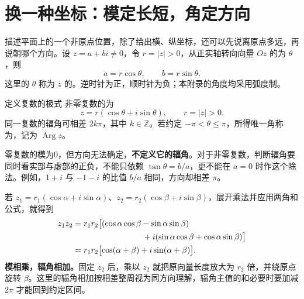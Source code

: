 \documentclass[a4paper,12pt,twoside,openany,fontset=none]{ctexbook}
\renewcommand{\le}{\leqslant}
\newcounter{definition}[chapter]
\newenvironment{definition}[1][]{\begin{defBox}{定义}{#1}}{\end{defBox}}
\numberwithin{equation}{chapter}
\begin{document}
\section{换一种坐标：模定长短，角定方向}

描述平面上的一个非原点位置，除了给出横、纵坐标，还可以先说离原点多远，再说朝哪个方向。设 $z=a+bi\ne0$，令 $r=|z|>0$，从正实轴转向向量 $Oz$ 的为 $\theta$，则
\[
    a=r\cos\theta,\qquad b=r\sin\theta.
\]
这里的 $\theta$ 称为 $z$ 的。逆时针为正，顺时针为负；本附录的角度均采用弧度制。

\begin{definition}[复数的极式]
非零复数的\textbf{}为
\[
    z=r(\cos\theta+i\sin\theta),\qquad r=|z|>0.
\]
同一复数的辐角可相差 $2k\pi$，其中 $k\in\mathbb Z$。若约定 $-\pi<\theta\le\pi$，所得唯一角称为\textbf{}，记为 $\operatorname{Arg}z$。
\end{definition}

零复数的模为0，但方向无法确定，\textbf{不定义它的辐角}。对于非零复数，判断辐角要同时看实部与虚部的正负，不能只依赖 $\tan\theta=b/a$，更不能在 $a=0$ 时作这个除法。例如，$1+i$ 与 $-1-i$ 的比值 $b/a$ 相同，方向却相差 $\pi$。

若 $z_1=r_1(\cos\alpha+i\sin\alpha)$、$z_2=r_2(\cos\beta+i\sin\beta)$，展开乘法并应用两角和公式，就得到
\[
\begin{aligned}
    z_1z_2
    &=r_1r_2\bigl[(\cos\alpha\cos\beta-\sin\alpha\sin\beta)\\
    &\hspace{30mm}+i(\sin\alpha\cos\beta+\cos\alpha\sin\beta)\bigr]\\
    &=r_1r_2\bigl[\cos(\alpha+\beta)+i\sin(\alpha+\beta)\bigr].
\end{aligned}
\]
\textbf{模相乘，辐角相加。}固定 $z_2$ 后，乘以 $z_2$ 就把原向量长度放大为 $r_2$ 倍，并绕原点旋转 $\beta$。这里的辐角相加按相差整周视为同方向理解，辐角主值的和必要时要加减 $2\pi$ 才能回到约定区间。
\end{document}
